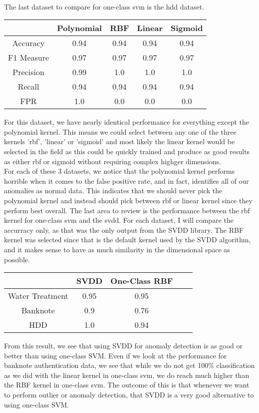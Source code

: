 \documentclass[journal]{IEEEtran}
\begin{document}
\hfill\linebreak\\
The last dataset to compare for one-class svm is the hdd dataset.
\begin{center}
 \begin{tabular}{| c | c c c c |} 
 \hline
 \hfill            & Polynomial & RBF & Linear & Sigmoid \\
 \hline\hline
Accuracy    & 0.94 	       & 0.94 & 0.94 & 0.94 \\ 
 \hline
F1 Measure & 0.97 	       & 0.97 & 0.97 & 0.97\\
 \hline
Precision   & 0.99	       & 1.0   & 1.0 & 1.0\\
 \hline
Recall        & 0.94 	       & 0.94 & 0.94 & 0.94\\
 \hline
FPR           & 1.0 	       & 0.0   & 0.0 & 0.0\\ 
 \hline
\end{tabular}
\end{center}
For this dataset, we have nearly identical performance for everything except the polynomial kernel. This means we could select between any one of the three kernels 'rbf', 'linear' or 'sigmoid' and most likely the linear kernel would be selected in the field as this could be quickly trained and produce as good results as either rbf or sigmoid without requiring complex highger dimensions.
\hfill\linebreak\\
For each of these 3 datasets, we notice that the polynomial kernel performs horrible when it comes to the false positive rate, and in fact, identifies all of our anomalies as normal data. This indicates that we should never pick the polynomial kernel and instead should pick between rbf or linear kernel since they perform best overall. The last area to review is the performance between the rbf kernel for one-class svm and the svdd. For each dataset, I will compare the accurracy only, as that was the only output from the SVDD library. The RBF kernel was selected since that is the default kernel used by the SVDD algorithm, and it makes sense to have as much similarity in the dimensional space as possible.
\begin{center}
 \begin{tabular}{| c | c c c c |} 
 \hline
 \hfill            & SVDD & One-Class RBF \\
 \hline\hline
Water Treatment & 0.95   & 0.95 	 \\ 
 \hline
Banknote & 0.9 & 0.76\\
 \hline
HDD   & 1.0 & 0.94 \\
 \hline
\end{tabular}
\end{center}
From this result, we see that using SVDD for anomaly detection is as good or better than using one-class SVM. Even if we look at the performance for banknote authentication data, we see that while we do not get 100\% classification as we did with the linear kernel in one-class svm, we do reach much higher than the RBF kernel in one-class svm. The outcome of this is that whenever we want to perform outlier or anomaly detection, that SVDD is a very good alternative to using one-class SVM.
\end{document}
